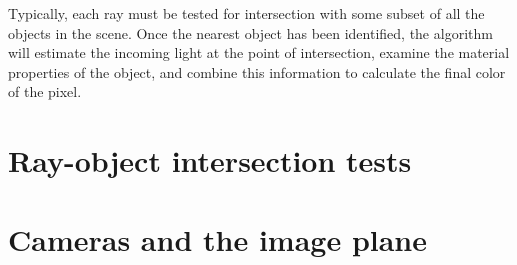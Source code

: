 \documentclass{article}
\begin{document}
Typically, each ray must be tested for intersection with some subset of all the objects in the scene. Once the nearest object has been identified, the algorithm will estimate the incoming light at the point of intersection, examine the material properties of the object, and combine this information to calculate the final color of the pixel. 

\clearpage


\section{Ray-object intersection tests}
\label{sec:isects}
















\section{Cameras and the image plane}
\label{sec:cameras}

\end{document}
